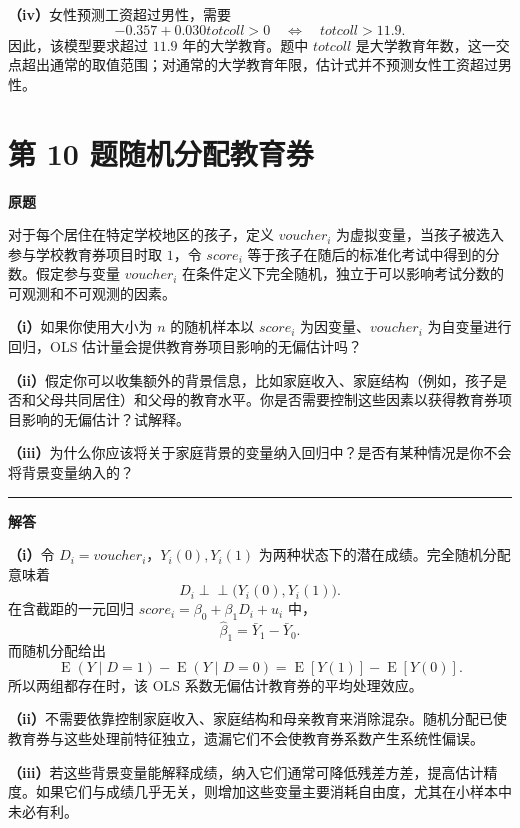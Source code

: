 \documentclass[UTF8,a4paper,11pt,fontset=fandol]{ctexart}
\newcommand{\vr}[1]{\mathit{#1}}
\newcommand{\E}{\operatorname{E}}
\newcommand{\subq}[1]{\par\medskip\noindent\textbf{（#1）}\enspace}
\newcommand{\question}[2]{\def\currentquestiontitle{第 #1 题\quad #2}}
\newenvironment{originalquestion}{%
  \par\medskip\noindent\begin{minipage}{\linewidth}
  \section*{\currentquestiontitle}
  \par\smallskip\noindent\textbf{原题}\par\smallskip
  \begingroup\small\setlength{\parskip}{2.5pt}%
}{%
  \par\endgroup\end{minipage}\par\medskip\Needspace{6\baselineskip}
  \noindent\rule{\linewidth}{0.35pt}\par\smallskip
  \noindent\textbf{解答}\par
}
\begin{document}
\subq{iv}女性预测工资超过男性，需要
\[
-0.357+0.030\vr{totcoll}>0
\quad\Longleftrightarrow\quad
\vr{totcoll}>11.9.
\]
因此，该模型要求超过 $11.9$ 年的大学教育。题中 $\vr{totcoll}$ 是大学教育年数，这一交点超出通常的取值范围；对通常的大学教育年限，估计式并不预测女性工资超过男性。

\question{10}{随机分配教育券}
\begin{originalquestion}
对于每个居住在特定学校地区的孩子，定义 $\vr{voucher}_i$ 为虚拟变量，当孩子被选入参与学校教育券项目时取 $1$，令 $\vr{score}_i$ 等于孩子在随后的标准化考试中得到的分数。假定参与变量 $\vr{voucher}_i$ 在条件定义下完全随机，独立于可以影响考试分数的可观测和不可观测的因素。

\subq{i}如果你使用大小为 $n$ 的随机样本以 $\vr{score}_i$ 为因变量、$\vr{voucher}_i$ 为自变量进行回归，OLS 估计量会提供教育券项目影响的无偏估计吗？

\subq{ii}假定你可以收集额外的背景信息，比如家庭收入、家庭结构（例如，孩子是否和父母共同居住）和父母的教育水平。你是否需要控制这些因素以获得教育券项目影响的无偏估计？试解释。

\subq{iii}为什么你应该将关于家庭背景的变量纳入回归中？是否有某种情况是你不会将背景变量纳入的？
\end{originalquestion}

\subq{i}令 $D_i=\vr{voucher}_i$，$Y_i(0),Y_i(1)$ 为两种状态下的潜在成绩。完全随机分配意味着
\[
D_i\perp\!\!\!\perp\bigl(Y_i(0),Y_i(1)\bigr).
\]
在含截距的一元回归 $\vr{score}_i=\beta_0+\beta_1D_i+u_i$ 中，
\[
\widehat\beta_1=\bar Y_1-\bar Y_0.
\]
而随机分配给出
\[
\E(Y\mid D=1)-\E(Y\mid D=0)
=\E[Y(1)]-\E[Y(0)].
\]
所以两组都存在时，该 OLS 系数无偏估计教育券的平均处理效应。

\subq{ii}不需要依靠控制家庭收入、家庭结构和母亲教育来消除混杂。随机分配已使教育券与这些处理前特征独立，遗漏它们不会使教育券系数产生系统性偏误。

\subq{iii}若这些背景变量能解释成绩，纳入它们通常可降低残差方差，提高估计精度。如果它们与成绩几乎无关，则增加这些变量主要消耗自由度，尤其在小样本中未必有利。
\end{document}
